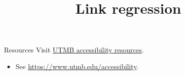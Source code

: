 \documentclass[14pt,t]{beamer-accessibility}
\title{Link regression}
\begin{document}
\begin{frame}{Resources}
Visit \href{https://www.utmb.edu/accessibility}{UTMB accessibility resources}.
\begin{itemize}
\item See \url{https://www.utmb.edu/accessibility}.
\end{itemize}
\end{frame}
\end{document}
